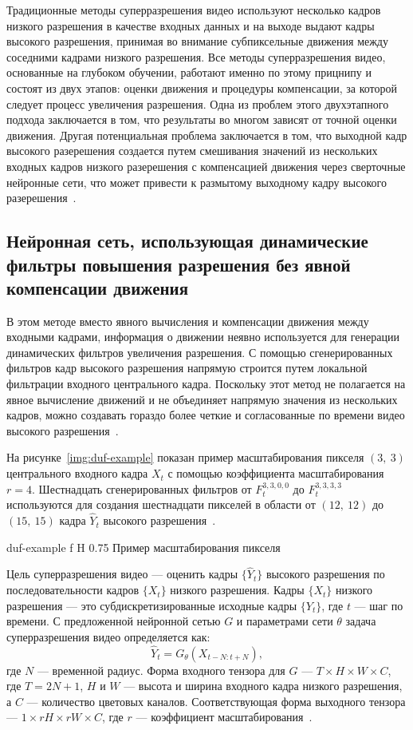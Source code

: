 \documentclass{bmstu}
\begin{document}
Традиционные методы суперразрешения видео используют несколько кадров низкого разрешения в качестве входных данных и на выходе выдают кадры высокого разрешения, принимая во внимание субпиксельные движения между соседними кадрами низкого разрешения. 
Все методы суперразрешения видео, основанные на глубоком обучении, работают именно по этому прицнипу и состоят из двух этапов: оценки движения и процедуры компенсации, за которой следует процесс увеличения разрешения. 
Одна из проблем этого двухэтапного подхода заключается в том, что результаты во многом зависят от точной оценки движения. 
Другая потенциальная проблема заключается в том, что выходной кадр высокого разерешения создается путем смешивания значений из нескольких входных кадров низкого разерешения с компенсацией движения через сверточные нейронные сети, что может привести к размытому выходному кадру высокого разерешения~\cite{Younghyun2018}.

\subsection{Нейронная сеть, использующая динамические фильтры повышения разрешения без явной компенсации движения}

В этом методе вместо явного вычисления и компенсации движения между входными кадрами, информация о движении неявно используется для генерации динамических фильтров увеличения разрешения. 
С помощью сгенерированных фильтров кадр высокого разрешения напрямую строится путем локальной фильтрации входного центрального кадра. 
Поскольку этот метод не полагается на явное вычисление движений и не объединяет напрямую значения из нескольких кадров, можно создавать гораздо более четкие и согласованные по времени видео высокого разрешения~\cite{Younghyun2018}.

На рисунке~\ref{img:duf-example} показан пример масштабирования пикселя $(3,~3)$ центрального входного кадра $X_t$ с помощью коэффициента масштабирования $r = 4$. 
Шестнадцать сгенерированных фильтров от $F^{3,3,0,0}_t$ до $F^{3,3,3,3}_t$ используются для создания шестнадцати пикселей в области от $(12,~12)$ до $(15,~15)$ кадра $\hat{Y}_t$ высокого разрешения~\cite{Younghyun2018}.

    {duf-example}
    {f}
    {H}
    {0.75\textwidth}
    {Пример масштабирования пикселя~\cite{Younghyun2018}}
    
Цель суперразрешения видео --- оценить кадры $\{\hat{Y}_t\}$ высокого разрешения по последовательности кадров $\{X_t\}$ низкого разрешения. 
Кадры $\{X_t\}$ низкого разрешения --- это субдискретизированные исходные кадры $\{Y_t\}$, где $t$ --- шаг по времени. 
С предложенной нейронной сетью $G$ и параметрами сети $\theta$ задача суперразрешения видео определяется как:
\begin{equation}
\hat{Y}_t = G_\theta(X_{t - N:t + N}),
\end{equation}
где $N$ --- временной радиус. 
Форма входного тензора для $G$ --- $T \times H \times W \times C$, где $T = 2N + 1$, $H$ и $W$ --- высота и ширина входного кадра низкого разрешения, а $C$ --- количество цветовых каналов. 
Соответствующая форма выходного тензора --- $1 \times rH \times rW \times C$, где $r$ --- коэффициент масштабирования~\cite{Younghyun2018}.
\end{document}
